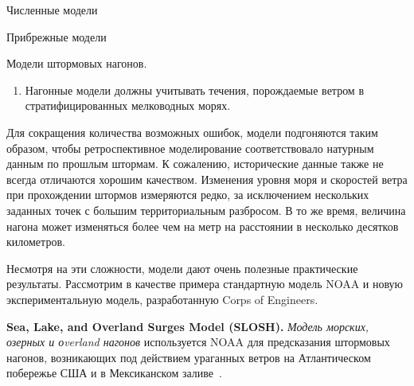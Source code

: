 \begin{chapter}{Численные модели}
\begin{section}{Прибрежные модели}
\begin{paragraph}{Модели штормовых нагонов.}
\begin{enumerate}
\item
Нагонные модели должны учитывать течения, порождаемые ветром в
стратифицированных мелководных морях.
%
\end{enumerate}
Для сокращения количества возможных ошибок, модели подгоняются таким образом,
чтобы ретроспективное моделирование соответствовало натурным данным по прошлым
штормам. К сожалению, исторические данные также не всегда отличаются
хорошим качеством. Изменения уровня моря и скоростей ветра при прохождении 
штормов измеряются редко, за исключением нескольких заданных точек с большим
территориальным разбросом. В то же время, величина нагона может изменяться 
более чем на метр на расстоянии в несколько десятков километров.
%

Несмотря на эти сложности, модели дают очень полезные практические
результаты. Рассмотрим в качестве примера стандартную модель NOAA
и новую экспериментальную модель, разработанную Corps of Engineers.
%

\textbf{Sea, Lake, and Overland Surges Model (SLOSH).}%
\emph{Модель морских, озерных и оverland нагонов} используется NOAA
для предсказания штормовых нагонов, возникающих под действием ураганных ветров
на Атлантическом побережье США и в Мексиканском заливе~\cite{Jelesnianski:1992}.
%


\end{paragraph}
\end{section}
\end{chapter}
